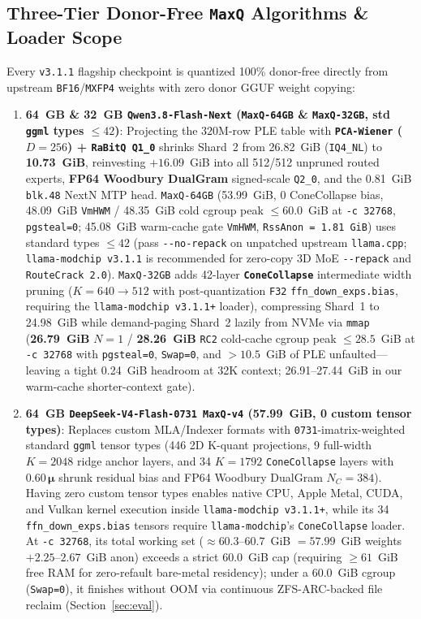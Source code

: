 \documentclass[10pt,twocolumn]{article}
\begin{document}
\subsection{Three-Tier Donor-Free \texttt{MaxQ} Algorithms \& Loader Scope}
Every \texttt{v3.1.1} flagship checkpoint is quantized 100\% donor-free directly from upstream \texttt{BF16}/\texttt{MXFP4} weights with zero donor GGUF weight copying:
\begin{enumerate}
    \item \textbf{64~GB \& 32~GB \texttt{Qwen3.8-Flash-Next} (\texttt{MaxQ-64GB} \& \texttt{MaxQ-32GB}, std \texttt{ggml} types $\le 42$)}:
    Projecting the $320\text{M}$-row PLE table with \textbf{\texttt{PCA-Wiener} ($D=256$) + \texttt{RaBitQ Q1\_0}} \cite{rabitq2024} shrinks Shard~2 from 26.82~GiB (\texttt{IQ4\_NL}) to \textbf{10.73~GiB}, reinvesting $+16.09$~GiB into all 512/512 unpruned routed experts, \textbf{FP64 Woodbury DualGram} signed-scale \texttt{Q2\_0}, and the 0.81~GiB \texttt{blk.48} NextN MTP head. \texttt{MaxQ-64GB} (53.99~GiB, 0 ConeCollapse bias, 48.09~GiB \texttt{VmHWM} / 48.35~GiB cold cgroup peak $\le 60.0$~GiB at \texttt{-c 32768}, \texttt{pgsteal=0}; 45.08~GiB warm-cache gate \texttt{VmHWM}, \texttt{RssAnon = 1.81~GiB}) uses standard types $\le 42$ (pass \texttt{{-}{-}no-repack} on unpatched upstream \texttt{llama.cpp}; \texttt{llama-modchip v3.1.1} is recommended for zero-copy 3D MoE \texttt{{-}{-}repack} and \texttt{RouteCrack 2.0}). \texttt{MaxQ-32GB} adds 42-layer \textbf{\texttt{ConeCollapse}} intermediate width pruning ($K=640\to 512$ with post-quantization \texttt{F32} \texttt{ffn\_down\_exps.bias}, requiring the \texttt{llama-modchip v3.1.1+} loader), compressing Shard~1 to 24.98~GiB while demand-paging Shard~2 lazily from NVMe via \texttt{mmap} (\textbf{26.79~GiB} $N=1$ / \textbf{28.26~GiB} \texttt{RC2} cold-cache cgroup peak $\le 28.5$~GiB at \texttt{-c 32768} with \texttt{pgsteal=0}, \texttt{Swap=0}, and $>10.5$~GiB of PLE unfaulted---leaving a tight 0.24~GiB headroom at 32K context; 26.91--27.44~GiB in our warm-cache shorter-context gate).
    \item \textbf{64~GB \texttt{DeepSeek-V4-Flash-0731 MaxQ-v4} (57.99~GiB, 0 custom tensor types)}:
    Replaces custom MLA/Indexer formats with \texttt{0731}-imatrix-weighted standard \texttt{ggml} tensor types (446 2D K-quant projections, 9 full-width $K=2048$ ridge anchor layers, and 34 $K=1792$ \texttt{ConeCollapse} layers with $0.60\,\boldsymbol{\mu}$ shrunk residual bias and FP64 Woodbury DualGram $N_C=384$). Having zero custom tensor types enables native CPU, Apple Metal, CUDA, and Vulkan kernel execution inside \texttt{llama-modchip v3.1.1+}, while its 34 \texttt{ffn\_down\_exps.bias} tensors require \texttt{llama-modchip}'s \texttt{ConeCollapse} loader. At \texttt{-c 32768}, its total working set (${\approx}60.3$--$60.7$~GiB $= 57.99$~GiB weights $+ 2.25$--$2.67$~GiB anon) exceeds a strict 60.0~GiB cap (requiring $\ge 61$~GiB free RAM for zero-refault bare-metal residency); under a 60.0~GiB cgroup (\texttt{Swap=0}), it finishes without OOM via continuous ZFS-ARC-backed file reclaim (Section~\ref{sec:eval}).

\end{enumerate}
\end{document}
